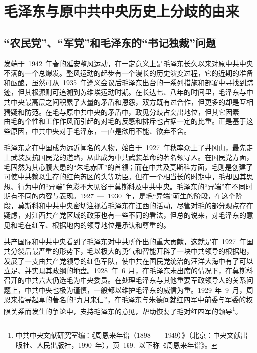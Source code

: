 
\chapter{毛泽东与原中共中央历史上分歧的由来}

\section{“农民党”、“军党”和毛泽东的“书记独裁”问题}

发端于~1942~年春的延安整风运动，在一定意义上是毛泽东长久以来对原中共中央不满的一个总爆发。整风运动的起步有一个漫长的历史演变过程，它的近期的准备和酝酿，虽然可从~1935~年遵义会议后毛泽东出台的一系列措施和部署中寻找到踪迹，但其根源则可追溯到苏维埃运动时期。在长达七、八年的时间里，毛泽东与中共中央最高层之间积累了大量的矛盾和恩怨，双方既有过合作，但更多的却是互相猜疑和防范。在毛与原中共中央的矛盾中，政见分歧占突出地位，但其它因素——由毛的个性和工作作风而引起的对毛的反感和排斥也占据一定的比重。正是基于这些原因，中共中央对于毛泽东，一直是欲用不能、欲弃不舍。

毛泽东之在中国成为远近闻名的人物，始自于~1927~年秋率众上了井冈山，最先走上武装反抗国民党的道路，从此成为中共武装革命的著名领导人。在国民党方面，毛固然为其心腹大患的“朱毛赤匪”的首领；而在中共及莫斯科方面，毛则是创建了可使中共赖以生存的红色苏区的头等功臣。但在一个相当长的时期中，毛却因其思想、行为中的“异端”色彩不大见容于莫斯科及中共中央。毛泽东的“异端”在不同时期有不同的内容与表现。1927~—~1930~年，是毛“异端”萌生的阶段，在这个阶段，莫斯科和中共中央密切注视着毛泽东在江西的活动，尽管对毛的部分观点存在疑虑，对江西共产党区域的政策也有一些不同的看法，但总的说来，对毛泽东的意见和毛在红军、根据地内的领导地位是承认和尊重的。

共产国际和中共中央看到了毛泽东对中共所作出的重大贡献，这就是在~1927~年国共分裂后最严重的形势下，毛以极大的勇气和智能开辟了一块中共领导的根据地，发展了一支由共产党领导的红色军队，使中共在国民党统治的汪洋大海中有了可以立足、并实现其政纲的地盘。1928~年~6~月，在毛泽东未出席的情况下，在莫斯科召开的中共六大仍选毛为中央委员。在处理毛泽东与其他重要军政领导人的关系问题上，中共中央也极为谨慎，一般都以维护毛泽东的威信为重。1929~年~9~月，周恩来指导起草的著名的“九月来信”，在毛泽东与朱德间就红四军中前委与军委的权限关系而发生的争论中，支持毛泽东的意见，帮助恢复了毛对红四军的领导\footnote{中共中央文献研究室编：《周恩来年谱（1898~—~1949）》（北京：中央文献出版社、人民出版社，1990~年），页~169.~以下称《周恩来年谱》。}。

